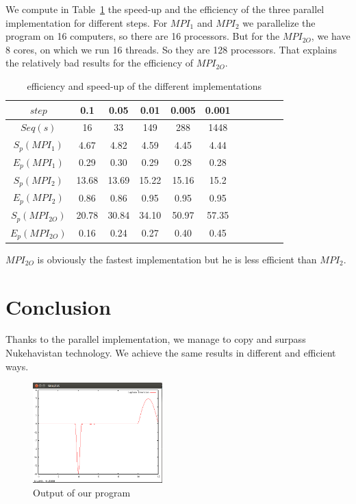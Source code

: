 \documentclass[11pt,a4paper]{article}
\begin{document}
We compute in Table~\ref{table:efficiency} the speed-up and the efficiency of the three parallel implementation for different steps. For $MPI_1$ and $MPI_2$ we parallelize the program on 16 computers, so there are 16 processors. But for the $MPI_{2O}$, we have 8 cores, on which we run 16 threads. So they are 128 processors. That explains the relatively bad results for the efficiency of $MPI_{2O}$. 

\begin{table}[h]
\centering
\begin{tabular}{|c|c|c|c|c|c|c|c|c|c|c|}
  \hline
  $step$ & 0.1 & 0.05 & 0.01 & 0.005 & 0.001\\ 
  \hline
  $Seq(s)$ & 16 & 33 & 149 & 288 & 1448\\
  \hline
   $S_p(MPI_1)$ & 4.67 & 4.82 & 4.59 & 4.45 & 4.44\\
  \hline
  $E_p(MPI_1)$ & 0.29 & 0.30 & 0.29 & 0.28 & 0.28\\
  \hline
   $S_p(MPI_2)$ & 13.68 & 13.69 & 15.22 & 15.16 & 15.2\\
  \hline
  $E_p(MPI_2)$ & 0.86 & 0.86 & 0.95 & 0.95 & 0.95\\
  \hline
   $S_p(MPI_{2O})$ & 20.78 & 30.84 & 34.10 & 50.97 & 57.35\\
  \hline
  $E_p(MPI_{2O})$ & 0.16 & 0.24 & 0.27 & 0.40 & 0.45\\
  \hline
  \end{tabular}
\caption{\label{table:efficiency} efficiency and speed-up of the different implementations}
\end{table}

$MPI_{2O}$ is obviously the fastest implementation but he is less efficient than $MPI_2$.

\section{Conclusion}
Thanks to the parallel implementation, we manage to copy and surpass Nukehavistan technology. We achieve the same results in different and efficient ways.

\begin{figure}[!h]
\centering
\includegraphics[width=5cm]{clock1.png}
\caption{Output of our program}
\label{clock1}
\end{figure}
\end{document}
